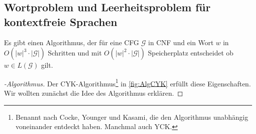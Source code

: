 \newcommand{\expl}[1]{}

\subsection{Wortproblem und Leerheitsproblem für kontextfreie Sprachen}
\begin{Satz}[name={[Wortproblem für \acs*{CFL} entscheidbar]}]
	Es gibt einen Algorithmus, der für eine \ac{CFG} $\mathcal{G}$ in \ac{CNF} und ein Wort $w$
	in $O(|w|^3\cdot |\mathcal{G}|)$ Schritten und mit $O(|w|^2\cdot |\mathcal{G}|)$ Speicherplatz
	entscheidet ob $w\in L(\mathcal{G})$ gilt.
\end{Satz}



\begin{proof}[-Algorithmus]
	Der \ac{CYK}-Algorithmus\footnote{Benannt nach Cocke, Younger
          und Kasami, die den Algorithmus unabhängig voneinander
          entdeckt haben. Manchmal auch YCK.} in \autoref{fig:AlgCYK} erfüllt diese Eigenschaften.
	Wir wollten zunächst die Idee des Algorithmus erklären.


\end{proof}
